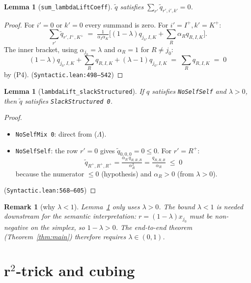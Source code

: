 \documentclass[11pt]{article}
\newtheorem{lemma}[theorem]{Lemma}
\newtheorem{remark}[theorem]{Remark}
\newcommand{\slack}{0}
\begin{document}
\begin{lemma}[\texttt{sum\_lambdaLiftCoeff}]
\label{lem:lift-conserv}
$\widetilde q$ satisfies $\sum_{r'} \widetilde q_{r', i', k'} = 0$.
\end{lemma}
\begin{proof}
For $i' = \slack$ or $k' = \slack$ every summand is zero. For
$i' = I^+, k' = K^+$:
\[
    \sum_{r'} \widetilde q_{r', I^+, K^+}
      \;=\; \tfrac{1}{\alpha_I \alpha_K}
            \Big[ (1 - \lambda) q_{j_0, I, K} + \sum_{R} \alpha_R q_{R, I, K} \Big].
\]
The inner bracket, using $\alpha_{j_0} = \lambda$ and $\alpha_R = 1$ for
$R \ne j_0$:
\[
    (1-\lambda) q_{j_0, I, K}
      + \sum_R q_{R, I, K} + (\lambda - 1) q_{j_0, I, K}
      \;=\; \sum_R q_{R, I, K} \;=\; 0
\]
by (P4). \hfill (\texttt{Syntactic.lean:498--542})
\end{proof}

\begin{lemma}[\texttt{lambdaLift\_slackStructured}]
\label{lem:lift-slack}
If $q$ satisfies \verb|NoSelfSelf| and $\lambda > 0$, then $\widetilde q$
satisfies \verb|SlackStructured 0|.
\end{lemma}
\begin{proof}\leavevmode
\begin{itemize}
  \item \verb|NoSelfMix 0|: direct from ($\Lambda$).
  \item \verb|NoSelfSelf|: the row $r' = \slack$ gives $\widetilde q_{\slack, \slack, \slack} = 0 \le 0$.
    For $r' = R^+$:
    \[
        \widetilde q_{R^+, R^+, R^+}
          = \tfrac{\alpha_R \, q_{R, R, R}}{\alpha_R^2}
          = \tfrac{q_{R, R, R}}{\alpha_R} \;\le\; 0
    \]
    because the numerator $\le 0$ (hypothesis) and $\alpha_R > 0$ (from $\lambda > 0$).
\end{itemize}
\hfill (\texttt{Syntactic.lean:568--605})
\end{proof}

\begin{remark}[why $\lambda < 1$]
Lemma~\ref{lem:lift-slack} only uses $\lambda > 0$. The bound $\lambda < 1$
is needed downstream for the \emph{semantic} interpretation:
$r = (1-\lambda) x_{j_0}$ must be non-negative on the simplex, so
$1 - \lambda > 0$. The end-to-end theorem (Theorem~\ref{thm:main}) therefore
requires $\lambda \in (0, 1)$.
\end{remark}

\section{r$^2$-trick and cubing}
\end{document}

